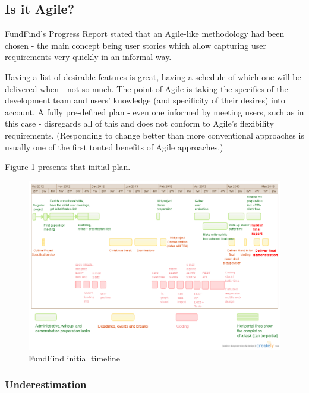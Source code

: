 \subsection{Is it Agile?}

FundFind's Progress Report \cite{progress-report} stated that an Agile-like methodology had been chosen - the main concept being user stories which allow capturing user requirements very quickly in an informal way.

Having a list of desirable features is great, having a schedule of which one will be delivered when - not so much. The point of Agile is taking the specifics of the development team and users' knowledge (and specificity of their desires) into account. A fully pre-defined plan - even one informed by meeting users, such as in this case - disregards all of this and does not conform to Agile's flexibility requirements. (Responding to change better than more conventional approaches is usually one of the first touted benefits of Agile approaches.) 

Figure \ref{fig:timeline} presents that initial plan.
\newpage
\begin{figure}[H]
\centering
\includegraphics[height=0.6\textheight,angle=90]{Images/timeline.png}
\caption{FundFind initial timeline}
\label{fig:timeline}
\end{figure}
\newpage

\subsubsection{Underestimation}


